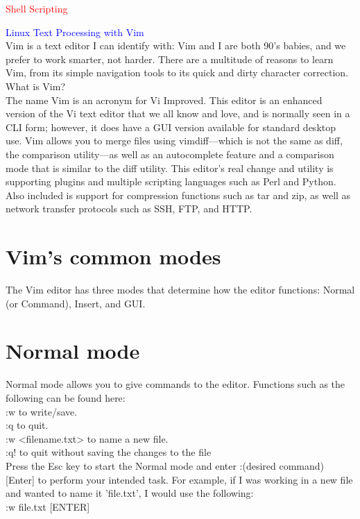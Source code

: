 \documentclass{article}
\begin{document}
\begin{center}
    \textcolor{red}{Shell Scripting}\\
\end{center}

\textcolor{blue}{Linux Text Processing with Vim}\\
Vim is a text editor I can identify with: Vim and I are both 90's babies, and we prefer to work smarter, not harder. There are a multitude of reasons to learn Vim, from its simple navigation tools to its quick and dirty character correction.\\
What is Vim?\\
The name Vim is an acronym for Vi Improved. This editor is an enhanced version of the Vi text editor that we all know and love, and is normally seen in a CLI form; however, it does have a GUI version available for standard desktop use. Vim allows you to merge files using vimdiff—which is not the same as diff, the comparison utility—as well as an autocomplete feature and a comparison mode that is similar to the diff utility. This editor's real change and utility is supporting plugins and multiple scripting languages such as Perl and Python. Also included is support for compression functions such as tar and zip, as well as network transfer protocols such as SSH, FTP, and HTTP.\\ 

\section*{Vim's common modes}
The Vim editor has three modes that determine how the editor functions: Normal (or Command), Insert, and GUI.\\

\section*{Normal mode}
Normal mode allows you to give commands to the editor. Functions such as the following can be found here:\\
    :w to write/save.\\
    :q to quit.\\
    :w <filename.txt> to name a new file.\\
    :q! to quit without saving the changes to the file\\
Press the Esc key to start the Normal mode and enter :(desired command) [Enter] to perform your intended task. For example, if I was working in a new file and wanted to name it 'file.txt', I would use the following:\\ 
:w file.txt [ENTER]\\
\end{document}
